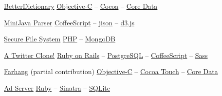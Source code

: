 \documentclass{tccv}
\begin{document}
{{\begin{project_list}
\end{project_list}

\begin{oneline_projects}

\item{\href{http://pooriaazimi.github.io/BetterDictionary/}{BetterDictionary}}
	 {%
	 	\href{https://en.wikipedia.org/wiki/Objective-C}{Objective-C} -- 
		\href{https://en.wikipedia.org/wiki/Cocoa_(API)}{Cocoa} -- 
		\href{https://en.wikipedia.org/wiki/Core_Data}{Core Data}%
	 }	

\item{\href{https://github.com/pooriaazimi/Mini-Java}{MiniJava Parser}}
	 {%
		 \href{http://coffeescript.org}{CoffeeScript} -- 
		 \href{http://zaach.github.io/jison/}{jison} -- 
		 \href{http://d3js.org}{d3.js}%
	 }

\item{\href{https://github.com/pooriaazimi/secure_file_system}{Secure File System}}
	 {%
		 \href{http://php.net}{PHP} -- 
		 \href{http://www.mongodb.org}{MongoDB}%
	 }

\item{\href{https://github.com/pooriaazimi/twitter}{A Twitter Clone!}}
	 {%
		 \href{http://rubyonrails.org}{Ruby on Rails} -- 
		 \href{http://www.postgresql.org}{PostgreSQL} -- 
		 \href{http://coffeescript.org}{CoffeeScript} -- 
		 \href{http://sass-lang.com}{Sass}%
	 }


\item{\href{http://www.turnedondigital.com/?portfolio=farhang-iphone-app}{Farhang} \large{(partial contribution)}}
	 {%
	 	\href{https://en.wikipedia.org/wiki/Objective-C}{Objective-C} -- 
		\href{https://en.wikipedia.org/wiki/Cocoa_Touch}{Cocoa Touch} -- 
		\href{https://en.wikipedia.org/wiki/Core_Data}{Core Data}%
	 }
	 

\item{\href{https://github.com/pooriaazimi/adserver}{Ad Server}}
	 {%
	 	\href{https://www.ruby-lang.org/en/}{Ruby} -- 
		\href{http://www.sinatrarb.com}{Sinatra} -- 
		\href{http://www.sqlite.org}{SQLite}%
	 }


\end{oneline_projects}








\vspace{-30pt}














}}
\end{document}
